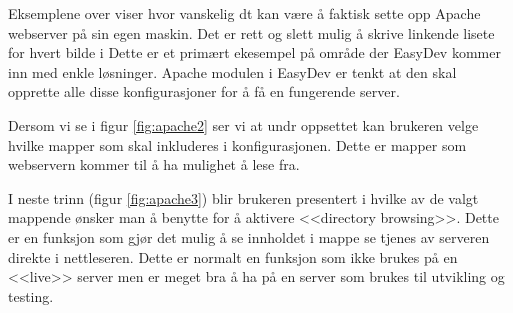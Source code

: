 Eksemplene over viser hvor vanskelig dt kan være å faktisk sette opp Apache webserver på sin egen maskin. Det er rett og slett mulig å skrive linkende lisete for hvert bilde i 
Dette er et primært ekesempel på område der EasyDev kommer inn med enkle løsninger. Apache modulen i EasyDev er tenkt at den skal opprette alle disse konfigurasjoner for å få en fungerende server.

Dersom vi se i figur \ref{fig:apache2} ser vi at undr oppsettet kan brukeren velge hvilke mapper som skal inkluderes i konfigurasjonen. Dette er mapper som webservern kommer til å ha mulighet å lese fra. 

I neste trinn (figur \ref{fig:apache3}) blir brukeren presentert i hvilke av de valgt mappende ønsker man å benytte for å aktivere <<directory browsing>>. Dette er en funksjon som gjør det mulig å se innholdet i mappe se tjenes av serveren direkte i nettleseren. Dette er normalt en funksjon som ikke brukes på en <<live>> server men er meget bra å ha på en server som brukes til utvikling og testing. 




